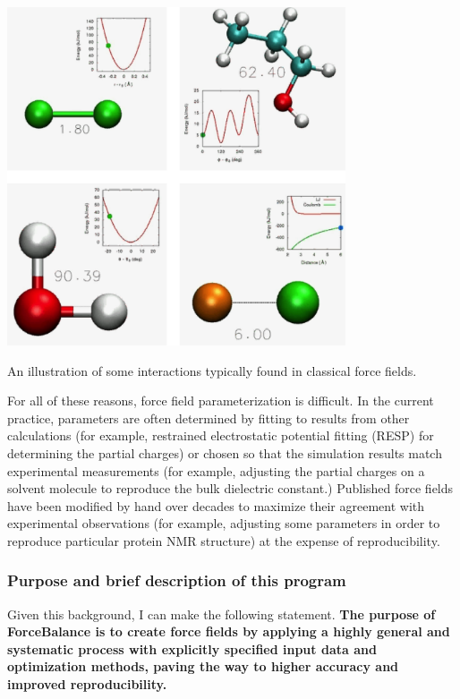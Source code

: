 \begin{DoxyImage}
\includegraphics[width=10cm]{interactions.png}
\caption{\-An illustration of some interactions typically found in classical force fields.}
\end{DoxyImage}


\-For all of these reasons, force field parameterization is difficult. \-In the current practice, parameters are often determined by fitting to results from other calculations (for example, restrained electrostatic potential fitting (\-R\-E\-S\-P) for determining the partial charges) or chosen so that the simulation results match experimental measurements (for example, adjusting the partial charges on a solvent molecule to reproduce the bulk dielectric constant.) \-Published force fields have been modified by hand over decades to maximize their agreement with experimental observations (for example, adjusting some parameters in order to reproduce particular protein \-N\-M\-R structure) at the expense of reproducibility.\hypertarget{index_mission_statement}{}\subsubsection{\-Purpose and brief description of this program}\label{index_mission_statement}
\-Given this background, \-I can make the following statement. {\bfseries \-The purpose of \-Force\-Balance is to create force fields by applying a highly general and systematic process with explicitly specified input data and optimization methods, paving the way to higher accuracy and improved reproducibility. }

